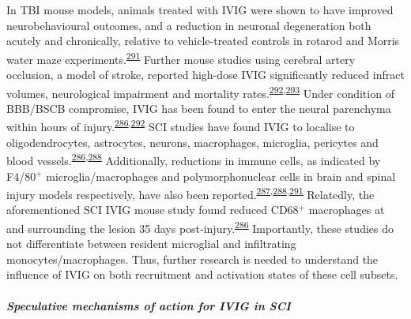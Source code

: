 \documentclass[
]{article}
\begin{document}
In TBI mouse models, animals treated with IVIG were shown to have improved neurobehavioural outcomes, and a reduction in neuronal degeneration both acutely and chronically, relative to vehicle-treated controls in rotarod and Morris water maze experiments.\textsuperscript{\protect\hyperlink{ref-jeong_intravenous_2014}{291}}
Further mouse studies using cerebral artery occlusion, a model of stroke, reported high-dose IVIG significantly reduced infract volumes, neurological impairment and mortality rates.\textsuperscript{\protect\hyperlink{ref-arumugam_intravenous_2007}{292},\protect\hyperlink{ref-widiapradja_intravenous_2012}{293}}
Under condition of BBB/BSCB compromise, IVIG has been found to enter the neural parenchyma within hours of injury.\textsuperscript{\protect\hyperlink{ref-brennan_ivig_2016}{286},\protect\hyperlink{ref-arumugam_intravenous_2007}{292}}
SCI studies have found IVIG to localise to oligodendrocytes, astrocytes, neurons, macrophages, microglia, pericytes and blood vessels.\textsuperscript{\protect\hyperlink{ref-brennan_ivig_2016}{286},\protect\hyperlink{ref-chio_effects_2019}{288}}
Additionally, reductions in immune cells, as indicated by F4/80\(^+\) microglia/macrophages and polymorphonuclear cells in brain and spinal injury models respectively, have also been reported.\textsuperscript{\protect\hyperlink{ref-nguyen_immunoglobulin_2012}{287},\protect\hyperlink{ref-chio_effects_2019}{288},\protect\hyperlink{ref-jeong_intravenous_2014}{291}}
Relatedly, the aforementioned SCI IVIG mouse study found reduced CD68\(^+\) macrophages at and surrounding the lesion 35 days post-injury.\textsuperscript{\protect\hyperlink{ref-brennan_ivig_2016}{286}}
Importantly, these studies do not differentiate between resident microglial and infiltrating monocytes/macrophages.
Thus, further research is needed to understand the influence of IVIG on both recruitment and activation states of these cell subsets.

\hypertarget{speculative-mechanisms-of-action-for-ivig-in-sci}{%
\subparagraph{Speculative mechanisms of action for IVIG in SCI}\label{speculative-mechanisms-of-action-for-ivig-in-sci}}
\end{document}
